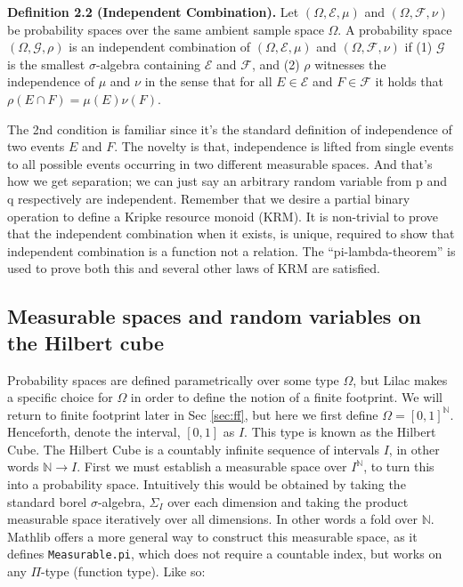 \textbf{Definition 2.2 \citep{lilac} (Independent Combination).}
Let $(\Omega, \mathcal{E},\mu)$ and $(\Omega, \mathcal{F},\nu)$ be probability spaces over the same ambient sample space $\Omega$. 
A probability space $(\Omega,\mathcal{G},\rho)$ is an independent combination of $(\Omega,\mathcal{E},\mu)$ and $(\Omega,\mathcal{F},\nu)$ if (1) $\mathcal{G}$ is 
the smallest $\sigma$-algebra containing $\mathcal{E}$ and $\mathcal{F}$, and (2) $\rho$ witnesses the independence of $\mu$ and $\nu$ in the sense that 
for all $E \in \mathcal{E}$ and $F \in \mathcal{F}$ it holds that $\rho(E \cap F) = \mu(E)\nu(F)$.

The 2nd condition is familiar since it's the standard definition of independence of two events $E$ and $F$. The novelty is that, independence is lifted from single events to all possible events
occurring in two different measurable spaces. And that's how we get separation; we can just say an arbitrary random variable from p and q respectively are independent.
Remember that we desire a partial binary operation to define a Kripke resource monoid (KRM). It is non-trivial to prove that the independent combination
when it exists, is unique, required to show that independent combination is a function not a relation. The ``pi-lambda-theorem'' is used to prove both this and several other laws of KRM are satisfied.

\subsection{Measurable spaces and random variables on the Hilbert cube}
Probability spaces are defined parametrically over some type $\Omega$, but Lilac makes a specific choice for $\Omega$ in order to define
the notion of a finite footprint. We will return to finite footprint later in Sec \ref{sec:ff}, but here we first define $\Omega = [0, 1]^{\mathbb{N}}$.
Henceforth, denote the interval, $[0,1]$ as $I$.
This type is known as the Hilbert Cube. The Hilbert Cube is a countably infinite sequence of intervals $I$,
in other words $\mathbb{N} \to I$. First we must establish a measurable space over $I^{\mathbb{N}}$, to turn this into a probability space.
Intuitively this would be obtained by taking the standard borel $\sigma$-algebra, $\Sigma_I$ over each dimension and taking the product measurable space iteratively over all dimensions.
In other words a fold over $\mathbb{N}$. Mathlib offers a more general way to construct this measurable space, as it defines \texttt{Measurable.pi}, which does not require a countable index, but works on any $\Pi$-type (function type). Like so:

